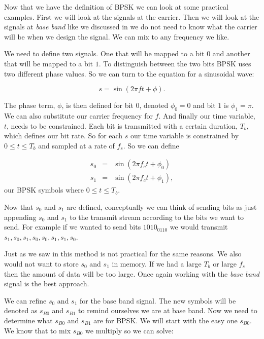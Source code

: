 Now that we have the definition of \ac{BPSK} we can look at some practical examples. First we will look at the signals at the carrier. Then we will look at the signals at \emph{base band} like we discussed in  we do not need to know what the carrier will be when we design the signal. We can mix to any frequency we like.

We need to define two signals. One that will be mapped to a bit $0$ and another that will be mapped to a bit $1$. To distinguish between the two bits \ac{BPSK} uses two different phase values. So we can turn to the equation for a sinusoidal wave:

\begin{equation}
s = \sin\left(2\pi ft + \phi\right).
\end{equation}

The phase term, $\phi$, is then defined for bit $0$, denoted $\phi_0=0$ and bit $1$ is $\phi_1=\pi$. We can also substitute our carrier frequency for $f$. And finally our time variable, $t$, needs to be constrained. Each bit is transmitted with a certain duration, $T_b$, which defines our bit rate. So for each $s$ our time variable is constrained by $0 \leq t \leq T_b$ and sampled at a rate of $f_s$. So we can define

\begin{eqnarray}
s_0 &=& \sin\left(2\pi f_ct + \phi_0\right)\\
s_1 &=& \sin\left(2\pi f_ct + \phi_1\right),
\end{eqnarray}
\noindent
our \ac{BPSK} symbols where $0 \leq t \leq T_b$.

Now that $s_0$ and $s_1$ are defined, conceptually we can think of sending bits as just appending $s_0$ and $s_1$ to the transmit stream according to the bits we want to send. For example if we wanted to send bits $1010_0110$ we would transmit $s_1, s_0, s_1, s_0, s_0, s_1, s_1, s_0$.

Just as we saw in  this method is not practical for the same reasons. We also would not want to store $s_0$ and $s_1$ in memory. If we had a large $T_b$ or large $f_s$ then the amount of data will be too large. Once again working with the \emph{base band} signal is the best approach.

We can refine $s_0$ and $s_1$ for the base band signal. The new symbols will be denoted as $s_{B0}$ and $s_{B1}$ to remind ourselves we are at base band. Now we need to determine what $s_{B0}$ and $s_{B1}$ are for \ac{BPSK}. We will start with the easy one $s_{B0}$. We know that to mix $s_{B0}$ we multiply so we can solve:

